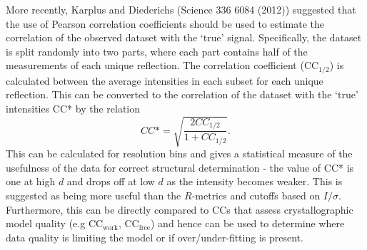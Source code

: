 \documentclass[11pt, oneside]{article}   	%
\begin{document}
More recently, Karplus and Diederichs (Science 336 6084 (2012)) suggested that the use of Pearson correlation coefficients should be used to estimate the correlation of the observed dataset with the `true' signal. Specifically, the dataset is split randomly into two parts, where each part contains half of the measurements of each unique reflection. The correlation coefficient (CC$_{1/2}$) is calculated between the average intensities in each subset for each unique reflection. This can be converted to the correlation of the dataset with the `true' intensities CC* by the relation
\begin{equation}
CC* = \sqrt{\frac{2 CC_{1/2}}{1 + CC_{1/2}}}.
\end{equation}
This can be calculated for resolution bins and gives a statistical measure of the usefulness of the data for correct structural determination - the value of CC* is one at high $d$ and drops off at low $d$ as the intensity becomes weaker. This is suggested as being more useful than the $R$-metrics and cutoffs based on $I/\sigma$. Furthermore, this can be directly compared to CCs that assess crystallographic model quality (e.g CC$_{\text{work}}$, CC$_{\text{free}}$) and hence can be used to determine where data quality is limiting the model or if over/under-fitting is present.
\end{document}
